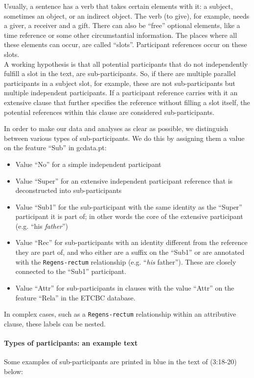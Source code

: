 \documentclass{report}
\newcommand{\mi}[1]{\lstinline{#1}}
\newcommand{\hebr}[1]{\cjRL{#1}}
\begin{document}
Usually, a sentence has a verb that takes certain elements with it: a subject, sometimes an object, or an indirect object. The verb \hebr{NTN} (to give), for example, needs a giver, a receiver and a gift. There can also be ``free'' optional elements, like a time reference or some other circumstantial information. The places where all these elements can occur, are called ``slots''. Participant references occur on these slots. \\
A working hypothesis is that all potential participants that do not independently fulfill a slot in the text, are sub-participants. So, if there are multiple parallel participants in a subject slot, for example, these are not sub-participants but multiple independent participants. If a participant reference carries with it an extensive clause that further specifies the reference without filling a slot itself, the potential references within this clause are considered sub-participants.

In order to make our data and analyses as clear as possible, we distinguish between various types of sub-participants. We do this by assigning them a value on the feature ``Sub'' in gcdata.pt:
\begin{itemize}
\item Value ``No'' for a simple independent participant
\item Value ``Super'' for an extensive independent participant reference that is deconstructed into sub-participants
\item Value ``Sub1'' for the sub-participant with the same identity as the ``Super'' participant it is part of; in other words the core of the extensive participant (e.g. ``his \emph{father}'')
\item Value ``Rec'' for sub-participants with an identity different from the reference they are part of, and who either are a suffix on the ``Sub1'' or are annotated with the \mi{Regens-rectum} relationship (e.g. ``\emph{his} father''). These are closely connected to the ``Sub1'' participant.
\item Value ``Attr'' for sub-participants in clauses with the value ``Attr'' on the feature ``Rela'' in the ETCBC database.
\end{itemize}

In complex cases, such as a \mi{Regens-rectum} relationship within an attributive clause, these labels can be nested.

\paragraph{Types of participants: an example text}
Some examples of sub-participants are printed in blue in the text of (3:18-20) below:\\
\end{document}
